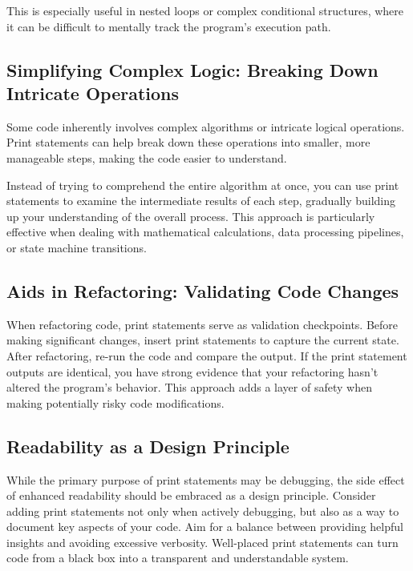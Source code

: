 \documentclass{article}
\begin{document}
{{{{This is especially useful in nested loops or complex conditional structures, where it can be difficult to mentally track the program's execution path.

\subsection*{Simplifying Complex Logic: Breaking Down Intricate Operations}

Some code inherently involves complex algorithms or intricate logical operations. Print statements can help break down these operations into smaller, more manageable steps, making the code easier to understand.

Instead of trying to comprehend the entire algorithm at once, you can use print statements to examine the intermediate results of each step, gradually building up your understanding of the overall process. This approach is particularly effective when dealing with mathematical calculations, data processing pipelines, or state machine transitions.

\subsection*{Aids in Refactoring: Validating Code Changes}
When refactoring code, print statements serve as validation checkpoints. Before making significant changes, insert print statements to capture the current state. After refactoring, re-run the code and compare the output. If the print statement outputs are identical, you have strong evidence that your refactoring hasn't altered the program's behavior. This approach adds a layer of safety when making potentially risky code modifications.
\subsection*{Readability as a Design Principle}

While the primary purpose of print statements may be debugging, the side effect of enhanced readability should be embraced as a design principle. Consider adding print statements not only when actively debugging, but also as a way to document key aspects of your code. Aim for a balance between providing helpful insights and avoiding excessive verbosity. Well-placed print statements can turn code from a black box into a transparent and understandable system.

\newpage

}}}}
\end{document}
